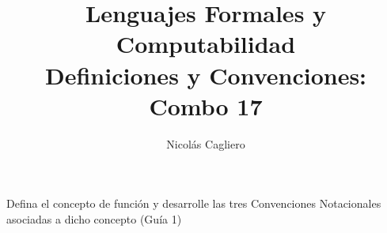 \documentclass{article}
\title{Lenguajes Formales y Computabilidad \\
        \large Definiciones y Convenciones: Combo 17 }
\author{Nicolás Cagliero}
\begin{document}
\maketitle

Defina el concepto de función y desarrolle las tres Convenciones
Notacionales asociadas a dicho concepto (Guía 1)
\end{document}
